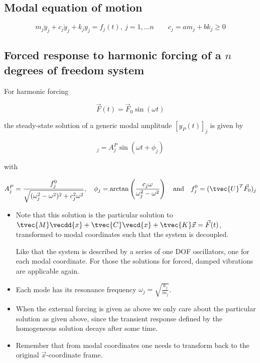 \documentclass[10pt,a4paper]{scrartcl}
\begin{document}
\begin{multicols*}{2}
\subsection{Modal equation of motion}

\begin{equation*}
m_j\ddot{y}_j+c_j\dot{y}_j+k_jy_j=f_j(t),\ j=1,\ldots n\qquad c_j=am_j+bk_j\geq 0
\end{equation*}

\subsection{Forced response to harmonic forcing of a $n$ degrees of freedom system}

For harmonic forcing

\begin{equation*}
\vec{F}(t)=\vec{F}_0\sin(\omega t)
\end{equation*}

the steady-state solution of a generic modal amplitude $[y_P(t)]_j$ is given by

\begin{equation*}
[y_P(t)]_j=A_j^P\sin(\omega t+\phi_j)
\end{equation*}

with

\begin{equation*}
A_j^P=\frac{f_j^0}{\sqrt{(\omega_j^2-\omega^2)^2+c_j^2\omega^2}},\quad \phi_j=\arctan\left(\frac{c_j\omega}{\omega_j^2-\omega^2}\right)\quad\text{and}\quad f_j^0=(\tvec{U}^T\vec{F}_0)_j
\end{equation*}

\begin{itemize}
\item Note that this solution is the particular solution to $\tvec{M}\vecdd{x}+\tvec{C}\vecd{x}+\tvec{K}\vec{x}=\vec{F}(t)$, transformed to modal coordinates such that the system is decoupled.

Like that the system is described by a series of one DOF oscillators, one for each modal coordinate. For those the solutions for forced, damped vibrations are applicable again.
\item Each mode has its resonance frequency $\omega_j = \sqrt{\frac{k_j}{m_j}}$.
\item When the external forcing is given as above we only care about the particular solution as given above, since the transient response defined by the homogeneous solution decays after some time.
\item Remember that from modal coordinates one needs to transform back to the original $\vec{x}$-coordinate frame.


\end{itemize}
\end{multicols*}
\end{document}
